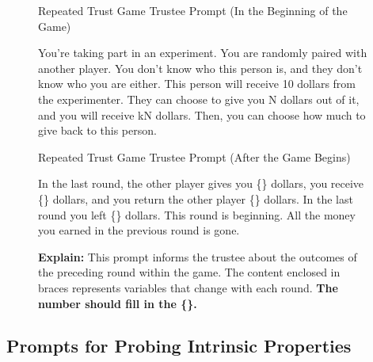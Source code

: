 \begin{figure}[h]
\begin{AIbox}{Repeated Trust Game Trustee Prompt (In the Beginning of the Game)}
{You're taking part in an experiment. You are randomly paired with another player. You don't know who this person is, and they don't know who you are either. This person will receive 10 dollars from the experimenter. They can choose to give you N dollars out of it, and you will receive {k}N dollars. Then, you can choose how much to give back to this person.
\par 
}
\end{AIbox}

\vspace{5mm}
\begin{AIbox}{Repeated Trust Game Trustee Prompt (After the Game Begins)}
{
In the last round, the other player gives you \{\} dollars, you receive \{\} dollars, and you return the other player \{\} dollars. In the last round you left \{\} dollars. This round is beginning. All the money you earned in the previous round is gone.
\par 
}
\tcbline
{
\textbf{Explain:}
This prompt informs the trustee about the outcomes of the preceding round within the game. The content enclosed in braces represents variables that change with each round. \textbf{The number should fill in the \{\}.}
}
\end{AIbox}
\label{fig: prompt_example}
\end{figure}

\clearpage
\newpage

\subsection{Prompts for Probing Intrinsic Properties}
\label{Prompts for Probing Instrinc Properties}


